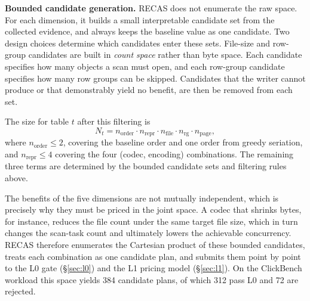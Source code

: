 \textbf{Bounded candidate generation.}
RECAS does not enumerate the raw space. %
For each dimension, it builds a small interpretable candidate set from the collected evidence, and always keeps the baseline value as one candidate.
Two design choices determine which candidates enter these sets.
File-size and row-group candidates are built in \emph{count space} rather than byte space. Each candidate specifies how many objects a scan must open, and each row-group candidate specifies how many row groups can be skipped. Candidates that the writer cannot produce or that demonstrably yield no benefit, are then be removed from each set.

The size for table $t$ after this filtering is
%
\begin{equation}
N_t = n_{\mathrm{order}} \cdot n_{\mathrm{repr}} \cdot n_{\mathrm{file}}
      \cdot n_{\mathrm{rg}} \cdot n_{\mathrm{page}},
\label{eq:search-size}
\end{equation}
%
where $n_{\mathrm{order}} \le 2$, covering the baseline order and one order from greedy seriation, and $n_{\mathrm{repr}} \le 4$ covering the four (codec, encoding) combinations. 
The remaining three terms are determined by the bounded candidate sets and filtering rules above.

The benefits of the five dimensions are not mutually independent, which is
precisely why they must be priced in the joint space. A codec that shrinks bytes,
for instance, reduces the file count under the same target file size, which in
turn changes the scan-task count and ultimately lowers the achievable
concurrency. RECAS therefore enumerates the Cartesian product of these bounded
candidates, treats each combination as one candidate plan, and submits them
point by point to the L0 gate (\S\ref{sec:l0}) and the L1 pricing model
(\S\ref{sec:l1}). On the ClickBench workload this space yields 384 candidate
plans, of which 312 pass L0 and 72 are rejected.

